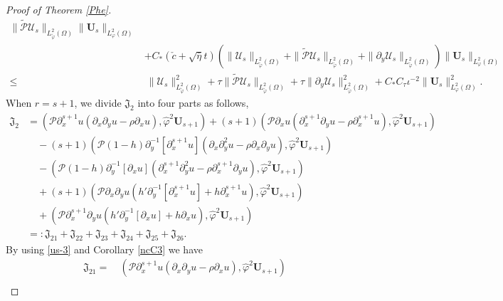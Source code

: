 \documentclass{amsart}
\numberwithin{equation}{section}
\begin{document}
\begin{proof}[Proof of Theorem \ref{Phe}]
\begin{align}
           \|\tilde{\mathcal{P}}\mathcal{U}_{s}\|_{L_{\tilde{\varphi}}^{2}(\Omega)}\|\mathbf{U}_{s}\|_{L_{\varphi}^{2}(\Omega)}\nonumber\\
    &+C_{*}(\check{c}+\sqrt{\bar{\eta}}t)
           \left(\|\mathcal{U}_{s}\|_{L_{\tilde{\varphi}}^{2}(\Omega)}
                 +\|\tilde{\mathcal{P}}\mathcal{U}_{s}\|_{L_{\tilde{\varphi}}^{2}(\Omega)}
                 +\|\partial_{y}\mathcal{U}_{s}\|_{L_{\tilde{\varphi}}^{2}(\Omega)}\right)
           \|\mathbf{U}_{s}\|_{L_{\varphi}^{2}(\Omega)}\nonumber\\
\leq&~\|\mathcal{U}_{s}\|_{L_{\tilde{\varphi}}^{2}(\Omega)}^{2}
     +\tau\|\tilde{\mathcal{P}}\mathcal{U}_{s}\|_{L_{\tilde{\varphi}}^{2}(\Omega)}
     +\tau\|\partial_{y}\mathcal{U}_{s}\|_{L_{\tilde{\varphi}}^{2}(\Omega)}^{2}
     +C_{*}C_{\tau}\iota^{-2}\|\mathbf{U}_{s}\|_{L_{\varphi}^{2}(\Omega)}^{2}.\nonumber
\end{align}
When $r=s+1$, we divide $\mathfrak{J}_{2}$ into four parts as follows,
\begin{align}\label{JJ2(2)}
\mathfrak{J}_{2}
&= (\mathcal{P}\partial_{x}^{s+1}u(\partial_{x}\partial_{y}u-\rho\partial_{x}u),\hat{\varphi}^{2}\mathbf{U}_{s+1})
  +(s+1)(\mathcal{P}\partial_{x}u(\partial_{x}^{s+1}\partial_{y}u-\rho\partial_{x}^{s+1}u),\hat{\varphi}^{2}\mathbf{U}_{s+1})\\
&\quad-(s+1)(\mathcal{P}(1-h)\partial_{y}^{-1}[\partial_{x}^{s+1}u](\partial_{x}\partial_{y}^{2}u-\rho\partial_{x}\partial_{y}u),\hat{\varphi}^{2}\mathbf{U}_{s+1})\nonumber\\
&\quad-(\mathcal{P}(1-h)\partial_{y}^{-1}[\partial_{x}u](\partial_{x}^{s+1}\partial_{y}^{2}u-\rho\partial_{x}^{s+1}\partial_{y}u),\hat{\varphi}^{2}\mathbf{U}_{s+1})\nonumber\\
&\quad+(s+1)(\mathcal{P}\partial_{x}\partial_{y}u(h'\partial_{y}^{-1}[\partial_{x}^{s+1}u]+h\partial_{x}^{s+1}u),\hat{\varphi}^{2}\mathbf{U}_{s+1})\nonumber\\
&\quad+(\mathcal{P}\partial_{x}^{s+1}\partial_{y}u(h'\partial_{y}^{-1}[\partial_{x}u]+h\partial_{x}u),\hat{\varphi}^{2}\mathbf{U}_{s+1})\nonumber\\
&=: \mathfrak{J}_{21}+\mathfrak{J}_{22}+\mathfrak{J}_{23}+\mathfrak{J}_{24}+\mathfrak{J}_{25}+\mathfrak{J}_{26}.\nonumber
\end{align}
By using \eqref{us-3} and Corollary \ref{ncC3} we have
\begin{align}\label{JJ21}
\mathfrak{J}_{21}
=&~(\mathcal{P}\partial_{x}^{s+1}u(\partial_{x}\partial_{y}u-\rho\partial_{x}u),\hat{\varphi}^{2}\mathbf{U}_{s+1})\\

\end{align}
\end{proof}
\end{document}
